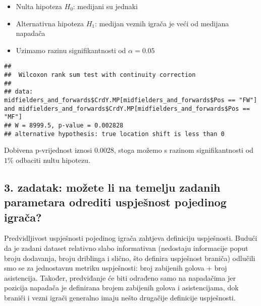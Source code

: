 \documentclass[
]{article}
\newenvironment{Shaded}{\begin{snugshade}}{\end{snugshade}}
\newcommand{\AttributeTok}[1]{\textcolor[rgb]{0.77,0.63,0.00}{#1}}
\newcommand{\FunctionTok}[1]{\textcolor[rgb]{0.00,0.00,0.00}{#1}}
\newcommand{\NormalTok}[1]{#1}
\newcommand{\SpecialCharTok}[1]{\textcolor[rgb]{0.00,0.00,0.00}{#1}}
\newcommand{\StringTok}[1]{\textcolor[rgb]{0.31,0.60,0.02}{#1}}
\providecommand{\tightlist}{%
  \setlength{\itemsep}{0pt}\setlength{\parskip}{0pt}}
\begin{document}
\begin{itemize}
\tightlist
\item
  Nulta hipoteza \(H_0\): medijani su jednaki
\item
  Alternativna hipoteza \(H_1\): medijan veznih igrača je veći od
  medijana napadača
\item
  Uzimamo razinu signifikantnosti od \(\alpha=0.05\)
\end{itemize}

\begin{Shaded}
\end{Shaded}

\begin{verbatim}
## 
##  Wilcoxon rank sum test with continuity correction
## 
## data:  midfielders_and_forwards$CrdY.MP[midfielders_and_forwards$Pos == "FW"] and midfielders_and_forwards$CrdY.MP[midfielders_and_forwards$Pos == "MF"]
## W = 8999.5, p-value = 0.002828
## alternative hypothesis: true location shift is less than 0
\end{verbatim}

Dobivena p-vrijednost iznosi 0.0028, stoga možemo s razinom
signifikantnosti od \(1\%\) odbaciti nultu hipotezu.

\hypertarget{zadatak-moux17eete-li-na-temelju-zadanih-parametara-odrediti-uspjeux161nost-pojedinog-igraux10da}{%
\subsection{3. zadatak: možete li na temelju zadanih parametara odrediti
uspješnost pojedinog
igrača?}\label{zadatak-moux17eete-li-na-temelju-zadanih-parametara-odrediti-uspjeux161nost-pojedinog-igraux10da}}

Predvidljivost uspješnosti pojedinog igrača zahtjeva definiciju
uspješnosti. Budući da je zadani dataset relativno slabo informativan
(nedostaju informacije poput broju dodavanja, broju driblinga i slično,
što definira uspješnost braniča) odlučili smo se za jednostavnu metriku
uspješnosti: broj zabijenih golova + broj asistencija. Također,
predviđanje će biti odrađeno samo na napadačima jer pozicija napadača je
definirana brojem zabijenih golova i asistencijama, dok braniči i vezni
igrači generalno imaju nešto drugačije definicije uspješnosti.
\end{document}
